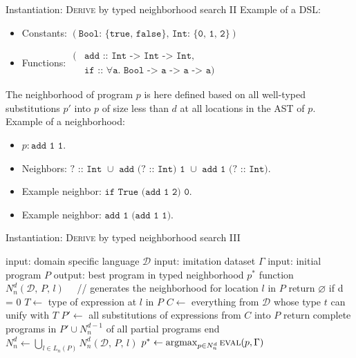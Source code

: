 \begin{frame}[fragile]{Instantiation: \textsc{Derive} by typed neighborhood search II}
Example of a DSL:
\begin{itemize}
    \item Constants: $(\texttt{Bool: \{true, false\}, Int: \{0, 1, 2\}})$
    \item Functions: $\begin{aligned}
        (&\texttt{add :: Int -> Int -> Int}, \\
         &\texttt{if :: $\forall$a. Bool -> a -> a -> a})
    \end{aligned}$
\end{itemize}

The neighborhood of program $p$ is here defined based on all well-typed substitutions $p'$ into $p$ of size less than $d$ at all locations in the AST of $p$. Example of a neighborhood:
\begin{itemize}
    \item $p: \texttt{add 1 1}$.
    \item Neighbors: $\texttt{? :: Int $\cup$ add (? :: Int) 1 $\cup$ add 1 (? :: Int)}$.
    \item Example neighbor: $\texttt{if True (add 1 2) 0}$.
    \item Example neighbor: $\texttt{add 1 (add 1 1)}$.
\end{itemize}
\end{frame}

\begin{frame}[fragile]{Instantiation: \textsc{Derive} by typed neighborhood search III}
    \begin{algorithm}[caption={Greedy search in the depth-limited typed neighborhood}]
     input: domain specific language $\mathcal{D}$
     input: imitation dataset $\Gamma$
     input: initial program $P$
     output: best program in typed neighborhood $p^*$
     function $N_n^d(\mathcal{D},\, P,\, l) \quad$ // generates the neighborhood for location $l$ in $P$
       return $\varnothing$ if d = 0
       $T \leftarrow $ type of expression at $l$ in $P$
       $C \leftarrow $ everything from $\mathcal{D}$ whose type $t$ can unify with $T$
       $P' \leftarrow $ all substitutions of expressions from $C$ into $P$
       return complete programs in $P' \cup N_n^{d-1}$ of all partial programs 
     end
     $N_n^d \leftarrow \bigcup_{l \in L_n(P)}N_n^d(\mathcal{D},\, P,\, l)$
     $p^* \leftarrow \operatorname*{argmax}_{p \in N_n^d}\textsc{eval}(p, \Gamma)$ 
    \end{algorithm}
\end{frame}

